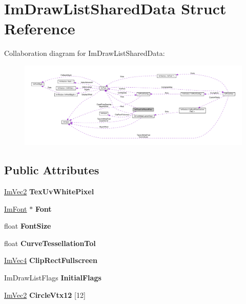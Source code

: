 \hypertarget{structImDrawListSharedData}{}\section{Im\+Draw\+List\+Shared\+Data Struct Reference}
\label{structImDrawListSharedData}


Collaboration diagram for Im\+Draw\+List\+Shared\+Data\+:\nopagebreak
\begin{figure}[H]
\begin{center}
\leavevmode
\includegraphics[width=350pt]{structImDrawListSharedData__coll__graph}
\end{center}
\end{figure}
\subsection*{Public Attributes}
\begin{DoxyCompactItemize}
\item 
\mbox{\label{structImDrawListSharedData_a8dff5fc643cab17128012383d75d9ad8}} 
\hyperlink{structImVec2}{Im\+Vec2} {\bfseries Tex\+Uv\+White\+Pixel}
\item 
\mbox{\label{structImDrawListSharedData_a4542431d4afe5320a965fbe52a3cc39f}} 
\hyperlink{structImFont}{Im\+Font} $\ast$ {\bfseries Font}
\item 
\mbox{\label{structImDrawListSharedData_a189a412fcd4f66a1d60501ad758d04bd}} 
float {\bfseries Font\+Size}
\item 
\mbox{\label{structImDrawListSharedData_a5b5bb46f5fd714b43e4b73a131b7f6f7}} 
float {\bfseries Curve\+Tessellation\+Tol}
\item 
\mbox{\label{structImDrawListSharedData_ac8737a7aae92c55d75998a6c9f6f3882}} 
\hyperlink{structImVec4}{Im\+Vec4} {\bfseries Clip\+Rect\+Fullscreen}
\item 
\mbox{\label{structImDrawListSharedData_a7e00a317793f4ed3ff592b050dfee450}} 
Im\+Draw\+List\+Flags {\bfseries Initial\+Flags}
\item 
\mbox{\label{structImDrawListSharedData_aca28baf42970650f5ee59c71dc905971}} 
\hyperlink{structImVec2}{Im\+Vec2} {\bfseries Circle\+Vtx12} \mbox{[}12\mbox{]}
\end{DoxyCompactItemize}


